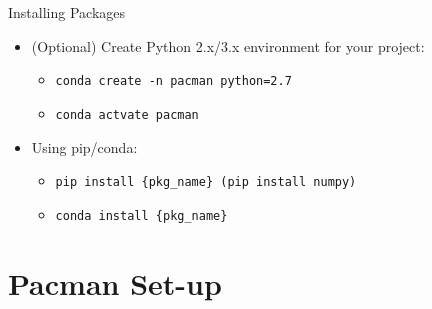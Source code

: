 \documentclass{beamer}
\begin{document}
\begin{frame}{Installing Packages}
    \begin{itemize}
        \item (Optional) Create Python 2.x/3.x environment for your project:
        \begin{itemize}
            \item \texttt{conda create -n pacman python=2.7}

            \item \texttt{conda actvate pacman}
        \end{itemize}

        \item Using pip/conda:
        \begin{itemize}
            \item \texttt{pip install \{pkg\_name\} (pip install numpy)}

            \item \texttt{conda install \{pkg\_name\}}
        \end{itemize}
    \end{itemize}
\end{frame}

\section{Pacman Set-up}
\end{document}
